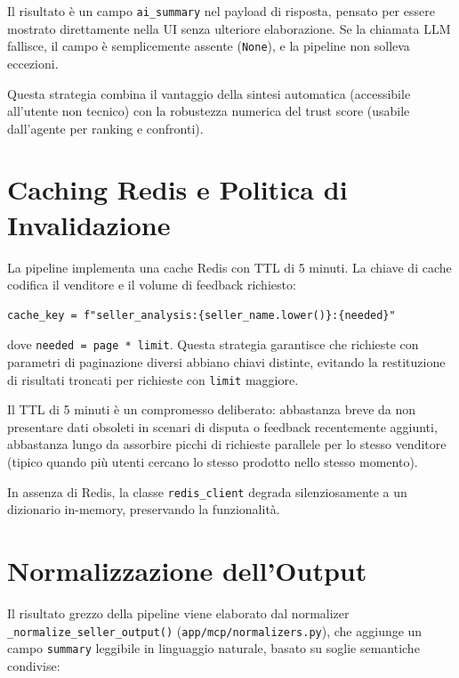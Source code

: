 Il risultato è un campo \texttt{ai\_summary} nel payload di risposta,
pensato per essere mostrato direttamente nella UI senza ulteriore
elaborazione. Se la chiamata LLM fallisce, il campo è semplicemente
assente (\texttt{None}), e la pipeline non solleva eccezioni.

Questa strategia combina il vantaggio della sintesi automatica
(accessibile all'utente non tecnico) con la robustezza numerica
del trust score (usabile dall'agente per ranking e confronti).


\section{Caching Redis e Politica di Invalidazione}
\label{sec:seller-cache}

La pipeline implementa una cache Redis con TTL di 5 minuti. La chiave
di cache codifica il venditore e il volume di feedback richiesto:

\begin{verbatim}
cache_key = f"seller_analysis:{seller_name.lower()}:{needed}"
\end{verbatim}

dove \texttt{needed = page * limit}. Questa strategia garantisce che
richieste con parametri di paginazione diversi abbiano chiavi distinte,
evitando la restituzione di risultati troncati per richieste con
\texttt{limit} maggiore.

Il TTL di 5 minuti è un compromesso deliberato: abbastanza breve da
non presentare dati obsoleti in scenari di disputa o feedback
recentemente aggiunti, abbastanza lungo da assorbire picchi di richieste
parallele per lo stesso venditore (tipico quando più utenti cercano
lo stesso prodotto nello stesso momento).

In assenza di Redis, la classe \texttt{redis\_client} degrada
silenziosamente a un dizionario in-memory, preservando la funzionalità.


\section{Normalizzazione dell'Output}
\label{sec:seller-normalizer}

Il risultato grezzo della pipeline viene elaborato dal normalizer
\texttt{\_normalize\_seller\_output()} (\texttt{app/mcp/normalizers.py}),
che aggiunge un campo \texttt{summary} leggibile in linguaggio naturale,
basato su soglie semantiche condivise:


